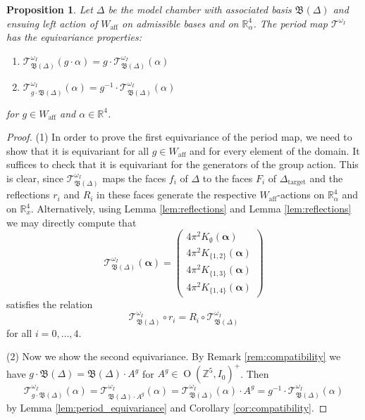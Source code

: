 \documentclass[12pt,letterpaper,reqno]{amsart}
\def\bm#1{#1}%
\def\mathbf#1{#1}%
\newtheorem{prop}[thm]{Proposition}
\theoremstyle{remark}
\theoremstyle{definition}
\numberwithin{thm}{section}
\numberwithin{equation}{section}
\numberwithin{figure}{section}
\newcommand{\R}{\ensuremath{\mathbb R}}
\newcommand{\Z}{\ensuremath{\mathbb Z}}
\newcommand{\bfalpha}{\ensuremath{\bm \alpha}}
\newcommand{\aff}{\mathrm{aff}}
\newcommand{\Simplex}{\Delta}
\DeclareMathOperator{\OO}{O}
\begin{document}
\begin{prop}\label{prop:equivariance}
Let $\Delta$ be the model chamber with associated basis $\mathfrak{B}(\Delta)$ and ensuing  left action of $W_\aff$ on admissible bases and on $\R^4_{\bfalpha}$. The period map $\mathcal{T}^{\omega_I}$ has the equivariance properties:
\begin{enumerate}
\item $\mathcal{T}_{\mathfrak{B}(\Delta)}^{\omega_I}(g \cdot \bfalpha) = g \cdot \mathcal{T}_{\mathfrak{B}(\Delta)}^{\omega_I}(\bfalpha)$ 
\smallskip
\item $\mathcal{T}_{g \cdot \mathfrak{B}(\Delta)}^{\omega_I}(\bfalpha) = g^{-1} \cdot \mathcal{T}_{\mathfrak{B}(\Delta)}^{\omega_I}(\bfalpha)$
\end{enumerate}
for $g \in W_\aff$ and $\bfalpha \in \R^4$.
\end{prop}

\begin{proof}
(1) In order to prove the first equivariance of the period map, we need to show that it is equivariant for all $g \in W_{\mathrm{aff}}$ and for every element of the domain.  It suffices to check that it is equivariant for the generators of the group action. This is clear, since $\mathcal{T}^{\omega_I}_{\mathfrak{B}(\Simplex)}$ maps the faces $f_i$ of $\Simplex$ to the faces $F_i$ of $\Simplex_{\mathrm{target}}$ and the reflections $r_i$ and $R_i$ in these faces generate the respective $W_\aff$-actions on $\R^4_{\bfalpha}$ and on $\R^4_{\mathbf{x}}$.
Alternatively, using Lemma \ref{lem:reflections} and Lemma \ref{lem:reflections} we may directly compute that 
\[ \mathcal{T}^{\omega_I}_{\mathfrak{B}(\Simplex)}(\boldsymbol{\alpha})=\begin{pmatrix} 4 \pi^2 K_{\emptyset}(\boldsymbol{\alpha})\\ 4 \pi^2 K_{\{1,2\}}(\boldsymbol{\alpha})\\4 \pi^2 K_{\{1, 3\}}(\boldsymbol{\alpha})\\4 \pi^2 K_{\{1, 4\}}(\boldsymbol{\alpha})\end{pmatrix}
\]
satisfies the relation
\[ 
\mathcal{T}^{\omega_I}_{\mathfrak{B}(\Simplex)} \circ r_i = R_i \circ \mathcal{T}^{\omega_I}_{\mathfrak{B}(\Simplex)}
\]
for all $i=0, \ldots, 4$.
\smallskip

\noindent (2) Now we show the second equivariance. By Remark \ref{rem:compatibility} we have $g \cdot \mathfrak{B}(\Delta) = \mathfrak{B}(\Delta) \cdot A^g$  for $A^g \in  \OO(\Z^5, I_0)^+$. Then \[
\mathcal{T}_{g \cdot \mathfrak{B}(\Delta)}^{\omega_I}(\bfalpha) = \mathcal{T}_{\mathfrak{B}(\Delta) \cdot A^g}^{\omega_I}(\bfalpha)=\mathcal{T}_{\mathfrak{B}(\Delta)}^{\omega_I}(\bfalpha) \cdot A^g = g^{-1} \cdot \mathcal{T}_{\mathfrak{B}(\Delta)}^{\omega_I}(\bfalpha)
\]
by Lemma \ref{lem:period_equivariance} and Corollary \ref{cor:compatibility}. 
\end{proof}
\end{document}
